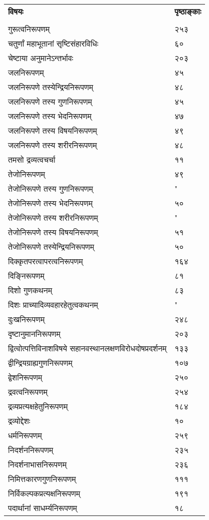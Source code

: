 \documentclass[11pt, openany]{book}
\begin{document}
\newpage
\noindent
\begin{tabular}{m{28em} m{2em}}
\textbf{विषयः} & \textbf{पृष्ठाङ्काः}\\
 & \\
 गुरूत्वनिरूपणम् & २५३\\
चतुर्णां महाभूतानां सृष्टिसंहारविधिः & ६०\\
चेष्टाया अनुमानेऽन्तर्भावः & २०३\\
जलनिरूपणम् & ४५\\
जलनिरूपणे तस्येन्द्रियनिरूपणम् & ४८\\
जलनिरूपणे तस्य गुणनिरूपणम् & ४५\\
जलनिरूपणे तस्य भेदनिरूपणम् & ४७\\
जलनिरूपणे तस्य विषयनिरूपणम् & ४९\\
जलनिरूपणे तस्य शरीरनिरूपणम् & ४८\\
तमसो द्रव्यत्वचर्चा & ११\\
तेजोनिरूपणम् & ४९\\
तेजोनिरूपणे तस्य गुणनिरूपणम् & "\\
तेजोनिरूपणे तस्य भेदनिरूपणम् & ५०\\
तेजोनिरूपणे तस्य शरीरनिरूपणम् & "\\
तेजोनिरूपणे तस्य विषयनिरूपणम् & ५१\\
तेजोनिरूपणे तस्येन्द्रियनिरूपणम् & ५०\\
दिक्कृतपरत्वापरत्वनिरूपणम् & १६४\\
दिङ्निरूपणम् & ८१\\
दिशो गुणकथनम् & ८३\\
दिशः प्राच्यादिव्यवहारहेतुत्वकथनम् & "\\
दुःखनिरूपणम् & २४८\\
दृष्टानुमाननिरूपणम् & २०३\\
द्वित्वोत्पत्तिविनाशविषये सहानवस्थानलक्षणविरोधदोषप्रदर्शनम् & १३३\\
द्वीन्द्रियग्राह्यगुणनिरूपणम् & १०७\\
द्वेशनिरूपणम् & २५०\\
द्रवत्वनिरूपणम् & २५४\\
द्रव्यप्रत्यक्षहेतुनिरूपणम् & १८४\\
द्रव्योद्देशः & १०\\
धर्मनिरूपणम् & २५९\\
निदर्शननिरूपणम् & २३५\\
निदर्शनाभासनिरूपणम् & २३६\\
निमित्तकारणगुणनिरूपणम् & १११\\
निर्विकल्पकप्रत्यक्षनिरूपणम् & १९१\\
पदार्थानां साधर्म्यनिरूपणम् & १८
\end{tabular}
\end{document}
